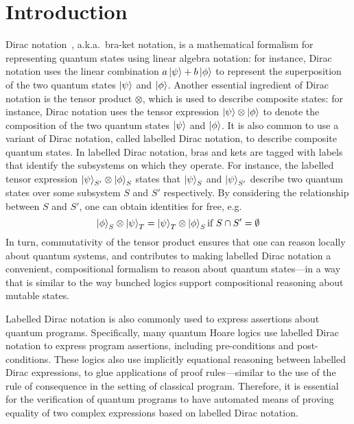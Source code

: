 
\section{Introduction}


Dirac notation~\cite{dirac1939new}, a.k.a.\, bra-ket notation, is a
mathematical formalism for representing quantum states using linear
algebra notation: for instance, Dirac notation uses the linear
combination \( a\ket{\psi} + b\ket{\phi} \) to represent the
superposition of the two quantum states \( \ket{\psi} \) and
\( \ket{\phi} \). Another essential ingredient of Dirac notation
is the tensor product $\otimes$, which is used to describe composite
states: for instance, Dirac notation uses the tensor expression
\( \ket{\psi} \otimes \ket{\phi} \) to denote the composition of
the two quantum states \( \ket{\psi} \) and \( \ket{\phi} \). It is
also common to use a variant of Dirac notation, called labelled Dirac
notation, to describe composite quantum states. In labelled Dirac
notation, bras and kets are tagged with labels that identify the
subsystems on which they operate. For instance, the labelled tensor
expression
\( \ket{\psi}_{S'} \otimes \ket{\phi}_{S} \)
states that $\ket{\psi}_S$ and $\ket{\psi}_{S'}$ describe two quantum
states over some subsystem $S$ and $S'$ respectively. By considering
the relationship between $S$ and $S'$, one can obtain identities for
free, e.g.\, 
%
$$\ket{\phi}_S \otimes \ket{\psi}_{T} = \ket{\psi}_{T} \otimes \ket{\phi}_S
\mbox{if}~S\cap S'=\emptyset$$
%
In turn, commutativity of the tensor product ensures that one can
reason locally about quantum systems, and contributes to making
labelled Dirac notation a convenient, compositional formalism to
reason about quantum states---in a way that is similar to the way
bunched logics support compositional reasoning about mutable states.

Labelled Dirac notation is also commonly used to express assertions
about quantum programs. Specifically, many quantum Hoare logics use
labelled Dirac notation to express program assertions, including
pre-conditions and post-conditions. These logics also use implicitly
equational reasoning between labelled Dirac expressions, to glue
applications of proof rules---similar to the use of the rule of
consequence in the setting of classical program. Therefore, it is
essential for the verification of quantum programs to have automated
means of proving equality of two complex expressions based on labelled
Dirac notation.


